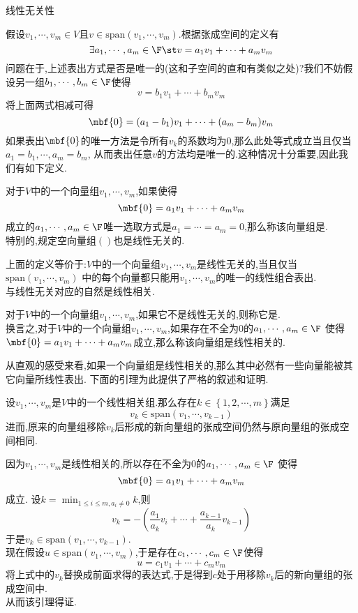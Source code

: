 \documentclass{ctexart}
\begin{document}
\pagestyle{empty}
\begin{center}\large 线性无关性\end{center}
假设$v_1,\cdots,v_m\in V$且$v\in\text{span}(v_1,\cdots,v_m)$.根据张成空间的定义有
$$\exists a_1,\cdots,a_m\in\F\st v=a_1v_1+\cdots+a_mv_m$$
问题在于,上述表出方式是否是唯一的(这和子空间的直和有类似之处)?我们不妨假设另一组$b_1,\cdots,b_m\in\F$使得
$$v=b_1v_1+\cdots+b_mv_m$$
将上面两式相减可得
$$\mbf{0}=(a_1-b_1)v_1+\cdots+(a_m-b_m)v_m$$
如果表出$\mbf{0}$的唯一方法是令所有$v_k$的系数均为$0$,那么此处等式成立当且仅当$a_1=b_1,\cdots,a_m=b_m$,
从而表出任意$v$的方法均是唯一的.这种情况十分重要,因此我们有如下定义.
\begin{definition}[1.1 定义:线性无关]
    对于$V$中的一个向量组$v_1,\cdots,v_m$,如果使得$$\mbf{0}=a_1v_1+\cdots+a_mv_m$$
    成立的$a_1,\cdots,a_m\in\F$唯一选取方式是$a_1=\cdots=a_m=0$,那么称该向量组是.\\
    特别的,规定空向量组$()$也是线性无关的.
\end{definition}\noindent
上面的定义等价于:$V$中的一个向量组$v_1,\cdots,v_m$是线性无关的,当且仅当$\text{span}(v_1,\cdots,v_m)$
中的每个向量都只能用$v_1,\cdots,v_m$的唯一的线性组合表出.\\
与线性无关对应的自然是线性相关.
\begin{definition}[1.2 定义:线性相关]
    对于$V$中的一个向量组$v_1,\cdots,v_m$,如果它不是线性无关的,则称它是.\\
    换言之,对于$V$中的一个向量组$v_1,\cdots,v_m$,如果存在不全为$0$的$a_1,\cdots,a_m\in\F$
    使得$\mbf{0}=a_1v_1+\cdots+a_mv_m$成立,那么称该向量组是线性相关的.
\end{definition}\noindent
从直观的感受来看,如果一个向量组是线性相关的,那么其中必然有一些向量能被其它向量所线性表出.
下面的引理为此提供了严格的叙述和证明.
\begin{formal}[1.3 线性相关性引理]
    设$v_1,\cdots,v_m$是$V$中的一个线性相关组.那么存在$k\in\left\{1,2,\cdots,m\right\}$满足
    $$v_k\in\text{span}(v_1,\cdots,v_{k-1})$$
    进而,原来的向量组移除$v_k$后形成的新向量组的张成空间仍然与原向量组的张成空间相同.
\end{formal}
\begin{solution}[Proof.]
    因为$v_1,\cdots,v_m$是线性相关的,所以存在不全为$0$的$a_1,\cdots,a_m\in\F$
    使得$$\mbf{0}=a_1v_1+\cdots+a_mv_m$$成立.
    设$\displaystyle k=\min_{1\leqslant i\leqslant m,a_i\neq0}k$,则
    $$v_k=-\left(\dfrac{a_1}{a_k}v_i+\cdots+\dfrac{a_{k-1}}{a_k}v_{k-1}\right)$$
    于是$v_k\in\text{span}(v_1,\cdots,v_{k-1})$.\\
    现在假设$u\in\text{span}(v_1,\cdots,v_{m})$,于是存在$c_1,\cdots,c_m\in\F$使得
    $$u=c_1v_1+\cdots+c_mv_m$$
    将上式中的$v_k$替换成前面求得的表达式,于是得到$c$处于用移除$v_k$后的新向量组的张成空间中.\\
    从而该引理得证.
\end{solution}\noindent
\end{document}
